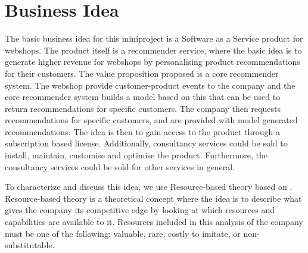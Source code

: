 \section{Business Idea}
The basic business idea for this miniproject is a Software as a Service product for webshops. 
The product itself is a recommender service, where the basic idea is to generate higher revenue for webshops by personalising product recommendations for their customers. 
The value proposition proposed is a core recommender system.
The webshop provide customer-product events to the company and the core recommender system builds a model based on this that can be used to return recommendations for specific customers.
The company then requests recommendations for specific customers, and are provided with model generated recommendations. 
The idea is then to gain access to the product through a subscription based license.
Additionally, consultancy services could be sold to install, maintain, customise and optimise the product. Furthermore, the consultancy services could be sold for other services in general.

To characterize and discuss this idea, we use Resource-based theory based on \citet[pg. 13]{book:jrose}.
Resource-based theory is a theoretical concept where the idea is to describe what gives the company its competitive edge by looking at which resources and capabilities are available to it.
Resources included in this analysis of the company must be one of the following: valuable, rare, costly to imitate, or non-substitutable.

